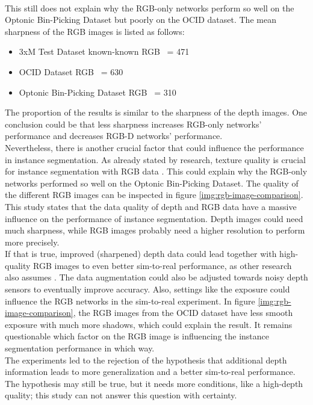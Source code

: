 		\\
		This still does not explain why the RGB-only networks perform so well on the Optonic Bin-Picking Dataset but poorly on the OCID dataset.
		The mean sharpness of the RGB images is listed as follows:
		\begin{itemize}
			\item 3xM Test Dataset known-known RGB ~= 471
			\item OCID Dataset RGB ~= 630
			\item Optonic Bin-Picking Dataset RGB ~= 310
		\end{itemize}
		The proportion of the results is similar to the sharpness of the depth images. One conclusion could be that less sharpness increases RGB-only networks' performance and decreases RGB-D networks' performance.\\
		Nevertheless, there is another crucial factor that could influence the performance in instance segmentation. As already stated by research, texture quality is crucial for instance segmentation with RGB data \cite{Tabak2023}\cite{Martinez2019}. This could explain why the RGB-only networks performed so well on the Optonic Bin-Picking Dataset. The quality of the different RGB images can be inspected in figure \ref{img:rgb-image-comparison}.\\
		This study states that the data quality of depth and RGB data have a massive influence on the performance of instance segmentation. Depth images could need much sharpness, while RGB images probably need a higher resolution to perform more precisely.\\
		If that is true, improved (sharpened) depth data could lead together with high-quality RGB images to even better sim-to-real performance, as other research also assumes \cite{Raj2023}\cite{Zakeri2024}. The data augmentation could also be adjusted towards noisy depth sensors to eventually improve accuracy.
		\clearpage
		Also, settings like the exposure could influence the RGB networks in the sim-to-real experiment. In figure \ref{img:rgb-image-comparison}, the RGB images from the OCID dataset have less smooth exposure with much more shadows, which could explain the result. It remains questionable which factor on the RGB image is influencing the instance segmentation performance in which way.\\
		The experiments led to the rejection of the hypothesis that additional depth information leads to more generalization and a better sim-to-real performance. The hypothesis may still be true, but it needs more conditions, like a high-depth quality; this study can not answer this question with certainty. 
	
